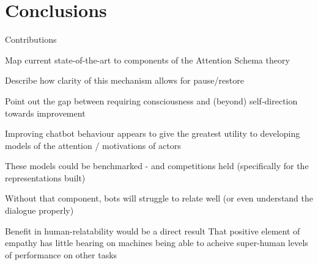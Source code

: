 \documentclass[citeauthoryear]{llncs}
\begin{document}
\section{Conclusions}

Contributions

	Map current state-of-the-art to components of the Attention Schema theory

	Describe how clarity of this mechanism allows for pause/restore

	Point out the gap between requiring consciousness and (beyond) self-direction towards improvement




Improving chatbot behaviour appears to give the greatest utility to developing models of the attention / motivations of actors

  These models could be benchmarked - and competitions held (specifically for the representations built)
  
  Without that component, bots will struggle to relate well (or even understand the dialogue properly)
  
  Benefit in human-relatability would be a direct result
    That positive element of empathy has little bearing on machines being able to acheive super-human levels of performance on other tasks
\end{document}
